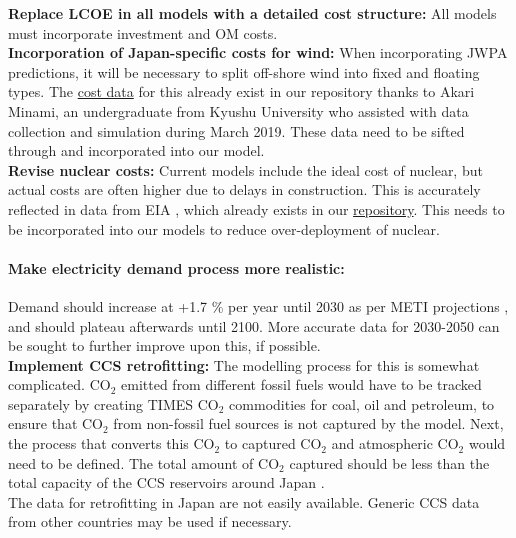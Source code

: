 \documentclass[14pt,a4paper]{article} %
\begin{document}
\textbf{Replace \gls{LCOE} in all models with a detailed cost structure:} All models must incorporate investment and \gls{OM} costs.\\

\textbf{Incorporation of Japan-specific costs for wind:} When incorporating \gls{JWPA} predictions, it will be necessary to split off-shore wind into fixed and floating types. The \href{https://github.com/arfc/i2cner/tree/master/data/japan_costs}{cost data} for this already exist in our repository thanks to Akari Minami, an undergraduate from Kyushu University who assisted with data collection and simulation during March 2019. These data need to be sifted through and incorporated into our model.\\

\textbf{Revise nuclear costs:} Current models include the ideal cost of nuclear, but actual costs are often higher due to delays in construction. This is accurately reflected in data from \gls{EIA} \cite{noauthor_eia_2019}, which already exists in our \href{https://github.com/arfc/i2cner/tree/master/data/japan_costs/fossil-ccs-nuc.xlsx}{repository}. This needs to be incorporated into our models to reduce over-deployment of nuclear.\\

\paragraph{Make electricity demand process more realistic:} Demand should increase at +1.7 \% per year until 2030 as per \gls{METI} projections \cite{noauthor_electricity_2017}, and should plateau afterwards until 2100. More accurate data for 2030-2050 can be sought to further improve upon this, if possible.\\

\textbf{Implement \gls{CCS} retrofitting:} The modelling process for this is somewhat complicated. CO$_2$ emitted from different fossil fuels would have to be tracked separately by creating \gls{TIMES}  CO$_2$ commodities for coal, oil and petroleum, to ensure that CO$_2$ from non-fossil fuel sources is not captured by the model. Next, the process that converts this CO$_2$ to captured CO$_2$ and atmospheric CO$_2$ would need to be defined. The total amount of CO$_2$ captured should be less than the total capacity of the \gls{CCS} reservoirs around Japan \cite{kato_energy_2016}.\\
The data for retrofitting in Japan are not easily available. Generic \gls{CCS} data from other countries may be used if necessary.\\


%


%

\end{document}
